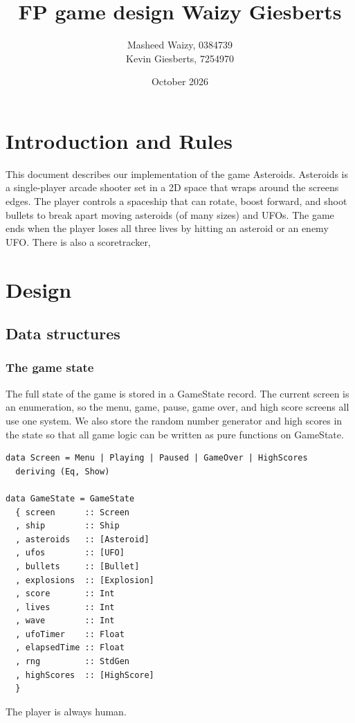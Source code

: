 \documentclass{article}
\title{FP game design Waizy Giesberts}
\author{Masheed Waizy, 0384739\\ Kevin Giesberts, 7254970}
\date{October 2026}
\begin{document}
\maketitle

\section{Introduction and Rules}
This document describes our implementation of the game Asteroids. Asteroids is a single-player arcade shooter set in a 2D space that wraps around the screens edges. The player controls a spaceship that can rotate, boost forward, and shoot bullets to break apart moving asteroids (of many sizes) and UFOs. The game ends when the player loses all three lives by hitting an asteroid or an enemy UFO. There is also a scoretracker,

\section{Design}
\subsection{Data structures}
\subsubsection{The game state}
The full state of the game is stored in a GameState record. The current screen is an enumeration, so the menu, game, pause, game over, and high score screens all use one system. We also store the random number generator and high scores in the state so that all game logic can be written as pure functions on GameState.
\begin{lstlisting}
data Screen = Menu | Playing | Paused | GameOver | HighScores
  deriving (Eq, Show)

data GameState = GameState
  { screen      :: Screen
  , ship        :: Ship
  , asteroids   :: [Asteroid]
  , ufos        :: [UFO]
  , bullets     :: [Bullet]
  , explosions  :: [Explosion]
  , score       :: Int
  , lives       :: Int
  , wave        :: Int
  , ufoTimer    :: Float
  , elapsedTime :: Float
  , rng         :: StdGen
  , highScores  :: [HighScore]
  }
\end{lstlisting}
The player is always human.
\end{document}
